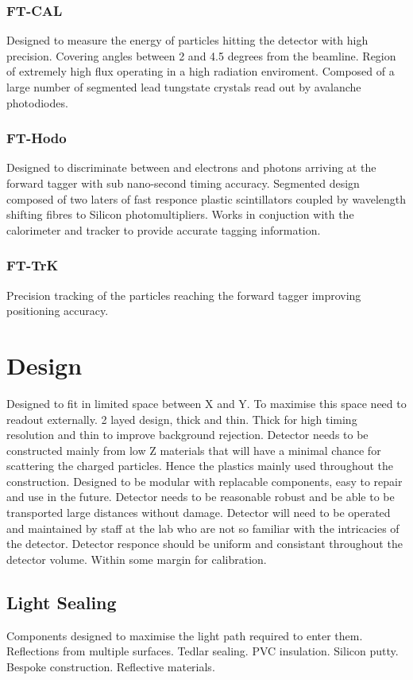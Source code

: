 \subsubsection{FT-CAL}
Designed to measure the energy of particles hitting the detector with high precision.
Covering angles between 2 and 4.5 degrees from the beamline.
Region of extremely high flux operating in a high radiation enviroment.
Composed of a large number of segmented lead tungstate crystals read out by avalanche photodiodes.

\subsubsection{FT-Hodo}
Designed to discriminate between and electrons and photons arriving at the forward tagger with sub nano-second timing accuracy.
Segmented design composed of two laters of fast responce plastic scintillators coupled by wavelength shifting fibres to Silicon photomultipliers.
Works in conjuction with the calorimeter and tracker to provide accurate tagging information.
\subsubsection{FT-TrK}
Precision tracking of the particles reaching the forward tagger improving positioning accuracy.
\section{Design}
Designed to fit in limited space between X and Y.
To maximise this space need to readout externally.
2 layed design, thick and thin. Thick for high timing resolution and thin to improve background rejection.
Detector needs to be constructed mainly from low Z materials that will have a minimal chance for scattering the charged particles. Hence the plastics mainly used throughout the construction.
Designed to be modular with replacable components, easy to repair and use in the future.
Detector needs to be reasonable robust and be able to be transported large distances without damage.
Detector will need to be operated and maintained by staff at the lab who are not so familiar with the intricacies of the detector.
Detector responce should be uniform and consistant throughout the detector volume. Within some margin for calibration.
\subsection{Light Sealing}
Components designed to maximise the light path required to enter them. Reflections from multiple surfaces.
Tedlar sealing.
PVC insulation.
Silicon putty.
Bespoke construction.
Reflective materials.
